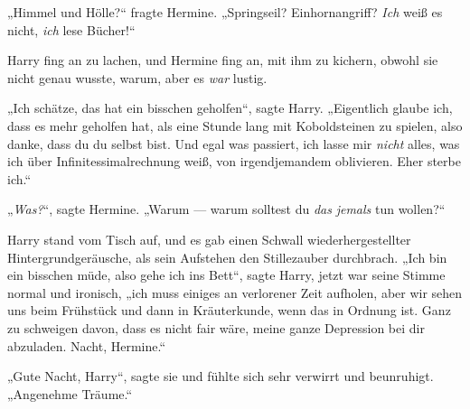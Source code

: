 „Himmel und Hölle?“ fragte Hermine.
„Springseil? Einhornangriff? \emph{Ich} weiß es nicht, \emph{ich} lese Bücher!“

Harry fing an zu lachen, und Hermine fing an, mit ihm zu kichern, obwohl sie nicht genau wusste, warum, aber es \emph{war} lustig.

„Ich schätze, das hat ein bisschen geholfen“, sagte Harry.
„Eigentlich glaube ich, dass es mehr geholfen hat, als eine Stunde lang mit Koboldsteinen zu spielen, also danke, dass du du selbst bist. Und egal was passiert, ich lasse mir \emph{nicht} alles, was ich über Infinitessimalrechnung weiß, von irgendjemandem oblivieren. Eher sterbe ich.“

„\emph{Was?}“, sagte Hermine.
„Warum — warum solltest du \emph{das} \emph{jemals} tun wollen?“

Harry stand vom Tisch auf, und es gab einen Schwall wiederhergestellter Hintergrundgeräusche, als sein Aufstehen den Stillezauber durchbrach.
„Ich bin ein bisschen müde, also gehe ich ins Bett“, sagte Harry, jetzt war seine Stimme normal und ironisch, „ich muss einiges an verlorener Zeit aufholen, aber wir sehen uns beim Frühstück und dann in Kräuterkunde, wenn das in Ordnung ist. Ganz zu schweigen davon, dass es nicht fair wäre, meine ganze Depression bei dir abzuladen. Nacht, Hermine.“

„Gute Nacht, Harry“, sagte sie und fühlte sich sehr verwirrt und beunruhigt.
„Angenehme Träume.“


